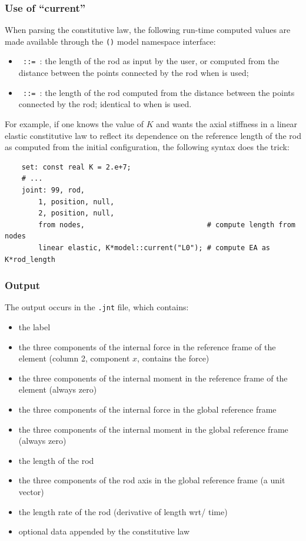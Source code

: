 \subsubsection{Use of ``current''}
When parsing the constitutive law, the following run-time computed values are made available
through the \texttt{()} model namespace interface:
\begin{itemize}
\item
{}\texttt{ ::= }:
the length of the rod  as input by the user,
or computed from the distance between the points connected by the rod when  is used;

\item
{}\texttt{ ::= }: 
the length of the rod computed from the distance between the points connected by the rod;
identical to  when  is used.
\end{itemize}
For example, if one knows the value of $K$ and wants the axial stiffness
in a linear elastic constitutive law to reflect its dependence
on the reference length of the rod as computed from the initial configuration,
the following syntax does the trick:
\begin{verbatim}
    set: const real K = 2.e+7;
    # ...
    joint: 99, rod,
        1, position, null,
        2, position, null,
        from nodes,                             # compute length from nodes
        linear elastic, K*model::current("L0"); # compute EA as K*rod_length
\end{verbatim}



\subsubsection{Output}
The output occurs in the \texttt{.jnt} file, which contains:
\begin{itemize}
\item the label
\item the three components of the internal force in the reference frame
of the element (column 2, component $x$, contains the force)
\item the three components of the internal moment in the reference frame
of the element (always zero)
\item the three components of the internal force in the global
reference frame
\item the three components of the internal moment in the global
reference frame (always zero)
\item the length of the rod
\item the three components of the rod axis in the global reference frame
(a unit vector)
\item the length rate of the rod (derivative of length wrt/ time)
\item optional data appended by the constitutive law
\end{itemize}

